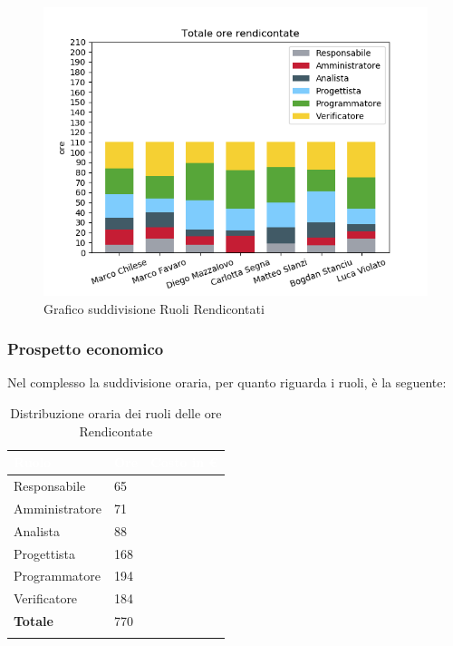 \begin{figure}[H]
	\centering
  		\includegraphics[width=1\linewidth]{./images/fig_tor.png}
  		\caption{Grafico suddivisione Ruoli Rendicontati}
  		\label{fig:grafico suddivione ruoli}
\end{figure}


\subsubsection{Prospetto economico}
Nel complesso la suddivisione oraria, per quanto riguarda i ruoli, è la seguente: 


\begin{longtable}{| C{.30\textwidth}| C{.15\textwidth}| C{.20\textwidth}|}
\hline
{}\textbf{\textcolor{white}{Ruolo}} & \textbf{\textcolor{white}{Ore}} & \textbf{\textcolor{white}{Costo in \euro}} \\
\hline
Responsabile & 65 &  \\
\hline
{}Amministratore & 71 &  \\
\hline
Analista & 88 &  \\
\hline
{}Progettista & 168 & \\
\hline 
Programmatore & 194 &  \\
\hline
{}Verificatore & 184 &  \\
\hline 
\textbf{Totale} & 770 & \\
\hline

\caption{Distribuzione oraria dei ruoli delle ore Rendicontate}
\label{Distribuzione oraria a carico del committente}
\end{longtable}

